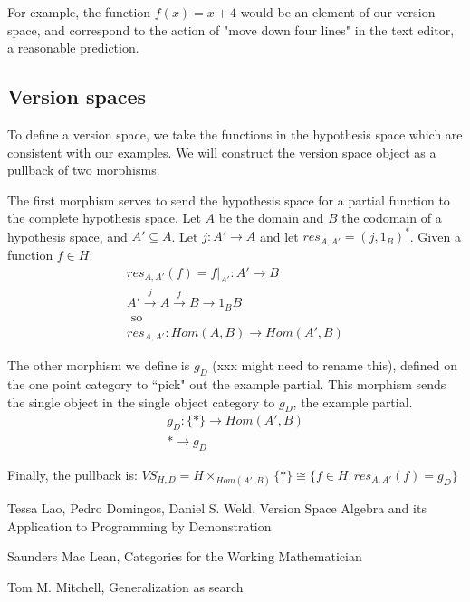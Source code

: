 \documentclass{article}
\theoremstyle{definition}
\begin{document}
For example, the function $f(x) = x + 4$ would be an element of our version space, and correspond to the action of "move down four lines" in the text editor, a reasonable prediction. 

\subsection{Version spaces}
To define a version space, we take the functions in the hypothesis space which are consistent with our examples. We will construct the version space object as a pullback of two morphisms. 

The first morphism serves to send the hypothesis space for a partial function to the complete hypothesis space. Let $A$ be the domain and $B$ the codomain of a hypothesis space, and $A'\subseteq A$. Let $j:A' \rightarrow A$ and let $res_{A, A'} = (j, 1_B)^*$. Given a function $f \in H$:
\begin{gather*}
    res_{A,A'}(f) = f|_{A'} : A' \rightarrow B \\
    A' \xrightarrow{j} A \xrightarrow{f} B \rightarrow{1_B} B \\
    \text{ so } \\
    res_{A, A'}: Hom(A,B) \rightarrow Hom(A',B)
\end{gather*}

The other morphism we define is $g_D$ (xxx might need to rename this), defined on the one point category to ``pick" out the example partial. This morphism sends the single object in the single object category to $g_D$, the example partial. 
\begin{gather*}
    g_D : \{*\} \rightarrow Hom(A',B) \\
    * \rightarrow g_D
\end{gather*}

Finally, the pullback is: $VS_{H,D} = H\times_{Hom(A',B)} \{*\} \cong  \{f\in H : res_{A, A'}(f) = g_D\}$ 




\begin{thebibliography}{9}
Tessa Lao, Pedro Domingos, Daniel S. Weld, Version Space Algebra and its Application to Programming by Demonstration

Saunders Mac Lean, Categories for the Working Mathematician

Tom M. Mitchell, Generalization as search
\end{thebibliography}
\end{document}
